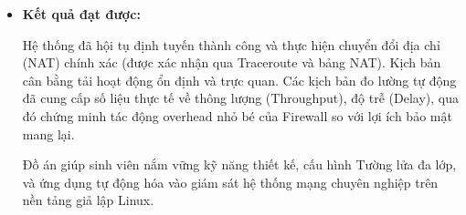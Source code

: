 \begin{itemize}
    Xây dựng một cấu trúc mạng mô phỏng hoàn chỉnh gồm Firewall, Core Router, Distribution và Access Switch. Cấu hình OSPF để đồng bộ bảng định tuyến nội bộ. Triển khai các quy tắc iptables khắt khe để bảo vệ vùng DMZ và cho phép truy cập ra Internet. Viết kịch bản Python giám sát ngưỡng 80\% băng thông để tự động cấu hình lại DNAT, chuyển hướng luồng dữ liệu sang máy chủ dự phòng.
    
    \item \textbf{Kết quả đạt được:}
    
    Hệ thống đã hội tụ định tuyến thành công và thực hiện chuyển đổi địa chỉ (NAT) chính xác (được xác nhận qua Traceroute và bảng NAT). Kịch bản cân bằng tải hoạt động ổn định và trực quan. Các kịch bản đo lường tự động đã cung cấp số liệu thực tế về thông lượng (Throughput), độ trễ (Delay), qua đó chứng minh tác động overhead nhỏ bé của Firewall so với lợi ích bảo mật mang lại.
    
    Đồ án giúp sinh viên nắm vững kỹ năng thiết kế, cấu hình Tường lửa đa lớp, và ứng dụng tự động hóa vào giám sát hệ thống mạng chuyên nghiệp trên nền tảng giả lập Linux.
\end{itemize}

\newpage